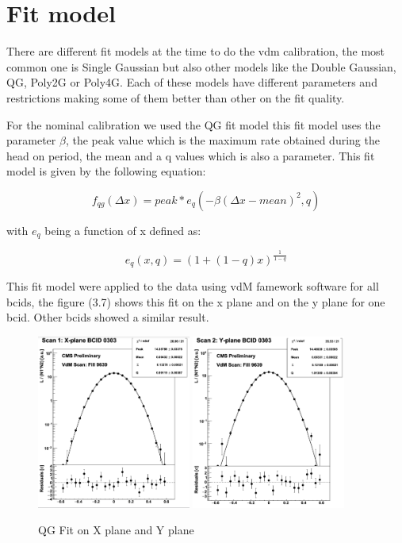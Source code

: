 \section{Fit model} 

There are different fit models at the time to do the vdm calibration, the most common one is Single Gaussian but also other models like the Double Gaussian, QG, Poly2G or Poly4G. Each of these models have different parameters and restrictions making some of them better than other on the fit quality. 

For the nominal calibration we used the QG fit model this fit model uses the parameter $\beta$, the peak value which is the maximum rate obtained during the head on period, the mean and a q values which is also a parameter. This fit model is given by the following equation:


\begin{equation}
f_{qg}(\Delta x) = peak * e_{q}(-\beta(\Delta x - mean)^{2},q)
\end{equation}

with $e_{q}$ being a function of x defined as: 

\begin{equation}
e_{q}(x, q) = (1+(1-q)x)^{\frac{1}{1-q}}
\end{equation}

This fit model were applied to the data using vdM famework software for all bcids, the figure (3.7) shows this fit on the x plane and on the y plane for one bcid. Other bcids showed a similar result.

\begin{figure}[H]
    \centering
    \includegraphics[width=0.45\textwidth]{fitqg1.png}
    \includegraphics[width=0.45\textwidth]{fitqg2.png}
    \caption{QG Fit on X plane and Y plane}
    \label{fig:QGfit}
\end{figure}

